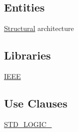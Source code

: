 \subsection*{Entities}
\begin{DoxyCompactItemize}
\item 
\hyperlink{classparallel__counter__4_1_1_structural}{Structural} architecture
\end{DoxyCompactItemize}
\subsection*{Libraries}
 \begin{DoxyCompactItemize}
\item 
\hypertarget{classparallel__counter__4_gae4f03c286607f3181e16b9aa12d0c6d4}{\hyperlink{group___majority_voter_gae4f03c286607f3181e16b9aa12d0c6d4}{I\+E\+E\+E} }\label{classparallel__counter__4_gae4f03c286607f3181e16b9aa12d0c6d4}

\end{DoxyCompactItemize}
\subsection*{Use Clauses}
 \begin{DoxyCompactItemize}
\item 
\hypertarget{classparallel__counter__4_gaa4b2b25246a821511120e3149b003563}{\hyperlink{group___majority_voter_gaa4b2b25246a821511120e3149b003563}{S\+T\+D\+\_\+\+L\+O\+G\+I\+C\+\_}   }\label{classparallel__counter__4_gaa4b2b25246a821511120e3149b003563}

\end{DoxyCompactItemize}
